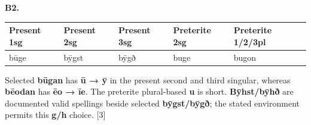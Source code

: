 \par\begin{minipage}{\linewidth}\raggedright
\textbf{B2.}

\par\begingroup
\fontsize{10.5}{13.2}\selectfont
\setlength{\LTleft}{0pt}\setlength{\LTright}{\fill}
\noindent
\begin{tabular}{@{}>{\raggedright\arraybackslash}p{21.11mm}>{\raggedright\arraybackslash}p{21.11mm}>{\raggedright\arraybackslash}p{21.11mm}>{\raggedright\arraybackslash}p{22.8mm}>{\raggedright\arraybackslash}p{26.6mm}@{}}
\toprule
\textbf{Present 1sg} & \textbf{Present 2sg} & \textbf{Present 3sg} & \textbf{Preterite 2sg} & \textbf{Preterite 1/\allowbreak{}2/\allowbreak{}3pl} \\
\midrule
būge & bȳgst & bȳgð & buge & bugon \\
\bottomrule
\end{tabular}
\par\endgroup

Selected \textbf{būgan} has \textbf{ū → ȳ} in the present second and third singular, whereas \textbf{bēodan} has \textbf{ēo → īe}. The preterite plural-based \textbf{u} is short. \textbf{Bȳhst/\allowbreak{}bȳhð} are documented valid spellings beside selected \textbf{bȳgst/\allowbreak{}bȳgð}; the stated environment permits this \textbf{g/\allowbreak{}h} choice. [3]

\end{minipage}\par\addvspace{4pt}

